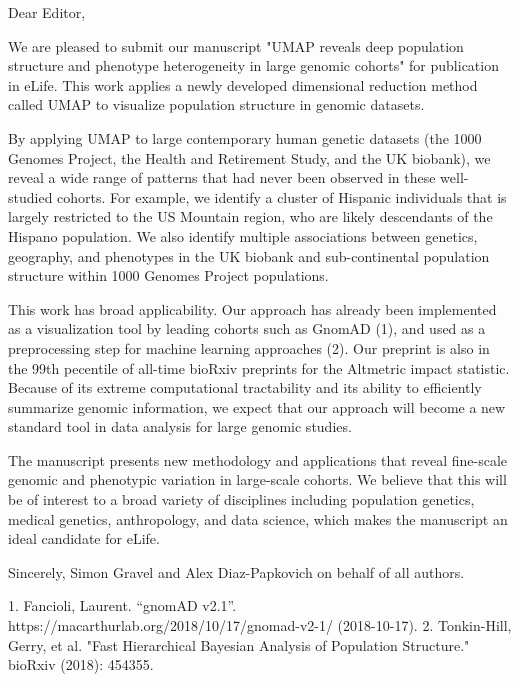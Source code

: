 Dear Editor,

We are pleased to submit our manuscript "UMAP reveals deep population structure and phenotype heterogeneity in large genomic cohorts" for publication in eLife. This work applies a newly developed dimensional reduction method called UMAP to visualize population structure in genomic datasets.

By applying UMAP to large contemporary human genetic datasets (the 1000 Genomes Project, the Health and Retirement Study, and the UK biobank), we reveal a wide range of patterns that had never been observed in these well-studied cohorts. For example, we identify a cluster of Hispanic individuals that is largely restricted to the US Mountain region, who are likely descendants of the Hispano population. We also identify multiple associations between genetics, geography, and phenotypes in the UK biobank and sub-continental population structure within 1000 Genomes Project populations.

This work has broad applicability. Our approach has already been implemented as a visualization tool by leading cohorts such as GnomAD (1), and used as a preprocessing step for machine learning approaches (2). Our preprint is also in the 99th pecentile of all-time bioRxiv preprints for the Altmetric impact statistic. Because of its extreme computational tractability and its ability to efficiently summarize genomic information, we expect that our approach will become a new standard tool in data analysis for large genomic studies. 

The manuscript presents new methodology and applications that reveal fine-scale genomic and phenotypic variation in large-scale cohorts.  
We believe that this will be of interest to a broad variety of disciplines including population genetics, medical genetics, anthropology, and data science, which makes the manuscript an ideal candidate for eLife.

Sincerely,
Simon Gravel and Alex Diaz-Papkovich
on behalf of all authors.

1. Fancioli, Laurent. “gnomAD v2.1”. https://macarthurlab.org/2018/10/17/gnomad-v2-1/ (2018-10-17).
2. Tonkin-Hill, Gerry, et al. "Fast Hierarchical Bayesian Analysis of Population Structure." bioRxiv (2018): 454355.
